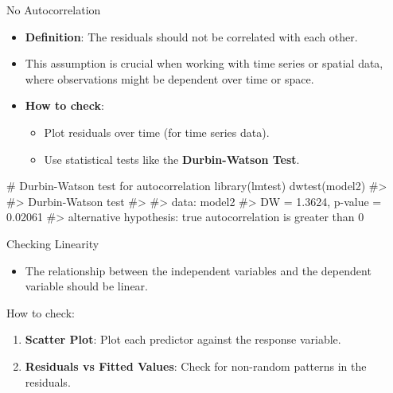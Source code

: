 \documentclass[
  18 pt,
  ignorenonframetext,
  aspectratio=1610,
]{beamer}
\newenvironment{Shaded}{\begin{snugshade}}{\end{snugshade}}
\newcommand{\CommentTok}[1]{\textcolor[rgb]{0.37,0.37,0.37}{#1}}
\newcommand{\FunctionTok}[1]{\textcolor[rgb]{0.28,0.35,0.67}{#1}}
\newcommand{\NormalTok}[1]{\textcolor[rgb]{0.00,0.23,0.31}{#1}}
\providecommand{\tightlist}{%
  \setlength{\itemsep}{0pt}\setlength{\parskip}{0pt}}\usepackage{longtable,booktabs,array}
\begin{document}
\begin{frame}[fragile]{No Autocorrelation}
\protect\hypertarget{no-autocorrelation}{}
\begin{itemize}
\item
  \textbf{Definition}: The residuals should not be correlated with each
  other.
\item
  This assumption is crucial when working with time series or spatial
  data, where observations might be dependent over time or space.
\item
  \textbf{How to check}:

  \begin{itemize}
  \tightlist
  \item
    Plot residuals over time (for time series data).
  \item
    Use statistical tests like the \textbf{Durbin-Watson Test}.
  \end{itemize}
\end{itemize}

\tiny

\begin{Shaded}
\begin{Highlighting}[]
\CommentTok{\# Durbin{-}Watson test for autocorrelation}
\FunctionTok{library}\NormalTok{(lmtest)}
\FunctionTok{dwtest}\NormalTok{(model2)}
\CommentTok{\#\textgreater{} }
\CommentTok{\#\textgreater{}  Durbin{-}Watson test}
\CommentTok{\#\textgreater{} }
\CommentTok{\#\textgreater{} data:  model2}
\CommentTok{\#\textgreater{} DW = 1.3624, p{-}value = 0.02061}
\CommentTok{\#\textgreater{} alternative hypothesis: true autocorrelation is greater than 0}
\end{Highlighting}
\end{Shaded}

\normalsize
\end{frame}

\begin{frame}{Checking Linearity}
\protect\hypertarget{checking-linearity}{}
\begin{itemize}
\tightlist
\item
  The relationship between the independent variables and the dependent
  variable should be linear.
\end{itemize}

\begin{block}{How to check:}
\protect\hypertarget{how-to-check}{}
\begin{enumerate}
\tightlist
\item
  \textbf{Scatter Plot}: Plot each predictor against the response
  variable.
\item
  \textbf{Residuals vs Fitted Values}: Check for non-random patterns in
  the residuals.
\end{enumerate}
\end{block}
\end{frame}
\end{document}
